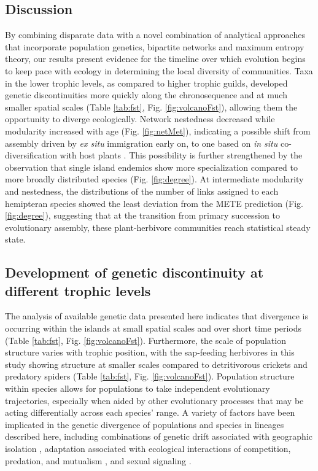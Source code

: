 \documentclass[12pt]{article}
\begin{document}
\begin{linenumbers}
\section*{Discussion}
By combining disparate data with a novel combination of analytical
approaches that incorporate population genetics, bipartite networks
and maximum entropy theory, our results present evidence for the
timeline over which evolution begins to keep pace with ecology in
determining the local diversity of communities. Taxa in the lower
trophic levels, as compared to higher trophic guilds, developed
genetic discontinuities more quickly along the chronosequence and at
much smaller spatial scales (Table \ref{tab:fst},
Fig. \ref{fig:volcanoFst}), allowing them the opportunity to diverge
ecologically. Network nestedness decreased while modularity increased
with age (Fig. \ref{fig:netMet}), indicating a possible shift from
assembly driven by {\it ex situ} immigration early on, to one based on
{\it in situ} co-diversification with host plants
\citep{Bascompte2007, Donatti2011}. This possibility is further
strengthened by the observation that single island endemics show more
specialization compared to more broadly distributed species
(Fig. \ref{fig:degree}). At intermediate modularity and nestedness,
the distributions of the number of links assigned to each hemipteran
species showed the least deviation from the METE prediction (Fig.
\ref{fig:degree}), suggesting that at the transition from primary
succession to evolutionary assembly, these plant-herbivore communities
reach statistical steady state. 

\subsection*{Development of genetic discontinuity at different trophic
  levels}

The analysis of available genetic data presented here indicates that
divergence is occurring within the islands at small spatial scales and
over short time periods (Table \ref{tab:fst},
Fig. \ref{fig:volcanoFst}). Furthermore, the scale of population
structure varies with trophic position, with the sap-feeding
herbivores in this study showing structure at smaller scales compared
to detritivorous crickets and predatory spiders (Table \ref{tab:fst},
Fig.  \ref{fig:volcanoFst}). Population structure within species
allows for populations to take independent evolutionary trajectories,
especially when aided by other evolutionary processes that may be
acting differentially across each species' range. A variety of factors
have been implicated in the genetic divergence of populations and
species in lineages described here, including combinations of genetic
drift associated with geographic isolation \citep{percy2003,
  gillespie2005, mendelson2005, ogrady2011, goodman2012}, adaptation
associated with ecological interactions of competition, predation, and
mutualism \citep{gillespie2004, blackledge2005, roderick2008}, and
sexual signaling \citep{mendelson2005, percy2006, magnacca2008,
  goodmanInRev}.


\end{linenumbers}
\end{document}
